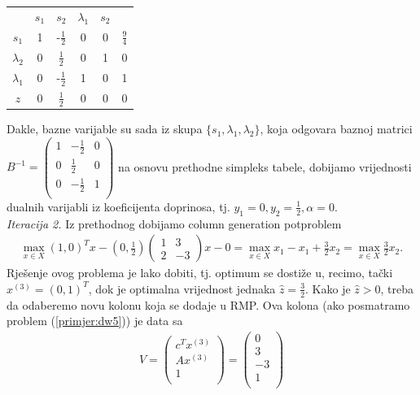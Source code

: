 \documentclass[a4paper, utf8, 11pt, colorlinks]{book}
\begin{document}
\begin{center}
	
	\begin{tabular}{c|ccccc}
	             	&$s_1$     &    $ s_2$                &  $\lambda_1$   & $s_2$     &                \\
		$s_1$	    &   1      &   -$\frac{1}{2}$         &   0         &     0         &  $\frac{9}{4}$ \\
		$\lambda_2$ &   0      &    $\frac{1}{2}$         &   0         &     1         &  0             \\
		$\lambda_1$ &   0      &    -$\frac{1}{2}$        &   1         &     0         &  1             \\ \hline
		$z$         &   0      &    $\frac{1}{2}$         &   0         &    0          &  0
	\end{tabular}
\end{center} 
Dakle, bazne varijable su sada iz skupa $\{s_1, \lambda_1, \lambda_2\}$, koja odgovara baznoj matrici 
$B^{-1} = 
\begin{pmatrix}
	   1 & -\frac{1}{2}    &  0 \\
	   0 & \frac{1}{2}     &  0  \\
	   0 & -\frac{1}{2}    &  1  \\
\end{pmatrix}$
na osnovu prethodne simpleks tabele, dobijamo   vrijednosti dualnih varijabli iz koeficijenta doprinosa, tj. $y_1 = 0, y_2 = \frac{1}{2}, \alpha = 0$. \\
\emph{Iteracija 2.} Iz prethodnog dobijamo column generation potproblem 
\begin{align}
	 \max_{x \in X} (1, 0)^T x - (0, \frac{1}{2})\left(\begin{array}{cc}
	 	1 & 3 \\
	 	2 & -3
	 \end{array}\right)  x   - 0 = \max_{x \in X}x_1 - x_1 + \frac{3}{2}x_2 = \max_{x \in X} \frac{3}{2}x_2.
\end{align}
Rješenje ovog problema je lako dobiti, tj. optimum se dostiže u, recimo,  tački $x^{(3)}= (0, 1)^T$, dok je optimalna vrijednost jednaka $\hat{z}= \frac{3}{2}$. Kako je $\hat{z} > 0$, treba da odaberemo novu kolonu koja se dodaje u RMP. 
Ova kolona (ako posmatramo problem (\ref{primjer:dw5})) je   data sa 
\begin{align}
	V =   \begin{pmatrix}
		c^T  x^{(3)}\\
		A  x^{(3)}  \\
		1     \\
	\end{pmatrix} = \begin{pmatrix}
		0 \\
		3  \\
		-3  \\
		1\\  
	\end{pmatrix}
\end{align}
\end{document}
